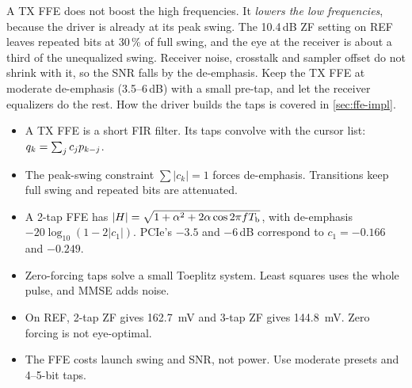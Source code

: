 \begin{insight}
A TX FFE does not boost the high frequencies. It \emph{lowers the low frequencies}, because the driver is already at its peak swing. The 10.4\,dB ZF setting on REF leaves repeated bits at 30\,\% of full swing, and the eye at the receiver is about a third of the unequalized swing. Receiver noise, crosstalk and sampler offset do not shrink with it, so the SNR falls by the de-emphasis. Keep the TX FFE at moderate de-emphasis (3.5--6\,dB) with a small pre-tap, and let the receiver equalizers do the rest. How the driver builds the taps is covered in \cref{sec:ffe-impl}.
\end{insight}

\begin{takeaways}
\begin{itemize}
  \item A TX FFE is a short FIR filter. Its taps convolve with the cursor list: $q_k=\sum_jc_jp_{k-j}$.
  \item The peak-swing constraint $\sum\lvert c_k\rvert=1$ forces de-emphasis. Transitions keep full swing and repeated bits are attenuated.
  \item A 2-tap FFE has $\lvert H\rvert=\sqrt{1+\alpha^2+2\alpha\cos2\pi fT_\mathrm{b}}$, with de-emphasis $-20\log_{10}(1-2\lvert c_1\rvert)$. PCIe's $-3.5$ and $-6$\,dB correspond to $c_1=-0.166$ and $-0.249$.
  \item Zero-forcing taps solve a small Toeplitz system. Least squares uses the whole pulse, and MMSE adds noise.
  \item On REF, 2-tap ZF gives \qty{162.7}{\milli\volt} and 3-tap ZF gives \qty{144.8}{\milli\volt}. Zero forcing is not eye-optimal.
  \item The FFE costs launch swing and SNR, not power. Use moderate presets and 4--5-bit taps.
\end{itemize}
\end{takeaways}
